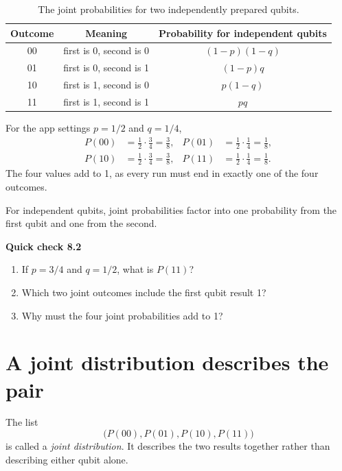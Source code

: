 \begin{table}[t]
\centering
\begin{tabular}{ccc}
\toprule
Outcome & Meaning & Probability for independent qubits \\
\midrule
00 & first is 0, second is 0 & $(1-p)(1-q)$ \\
01 & first is 0, second is 1 & $(1-p)q$ \\
10 & first is 1, second is 0 & $p(1-q)$ \\
11 & first is 1, second is 1 & $pq$ \\
\bottomrule
\end{tabular}
\caption{The joint probabilities for two independently prepared qubits.}
\label{tab:ch08-independent-joint-probabilities}
\end{table}

For the app settings $p=1/2$ and $q=1/4$,
\begin{align}
P(00)&=\frac{1}{2}\cdot\frac{3}{4}=\frac{3}{8}, &
P(01)&=\frac{1}{2}\cdot\frac{1}{4}=\frac{1}{8},\\
P(10)&=\frac{1}{2}\cdot\frac{3}{4}=\frac{3}{8}, &
P(11)&=\frac{1}{2}\cdot\frac{1}{4}=\frac{1}{8}.
\end{align}
The four values add to 1, as every run must end in exactly one of the four outcomes.

\begin{coreidea}
For independent qubits, joint probabilities factor into one probability from the first qubit and one from the second.
\end{coreidea}

\begin{checkpoint}
\textbf{Quick check 8.2}
\begin{enumerate}
  \item If $p=3/4$ and $q=1/2$, what is $P(11)$?
  \item Which two joint outcomes include the first qubit result 1?
  \item Why must the four joint probabilities add to 1?
\end{enumerate}
\end{checkpoint}

\section{A joint distribution describes the pair}
\label{sec:ch08-joint-distribution}

The list
\begin{equation}
\bigl(P(00),P(01),P(10),P(11)\bigr)
\end{equation}
is called a \emph{joint distribution}. It describes the two results together rather than describing either qubit alone.

